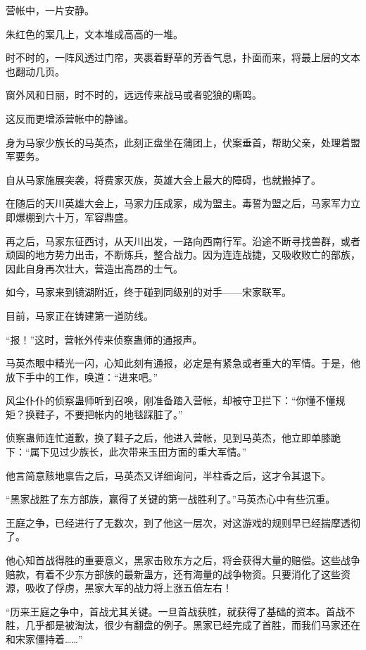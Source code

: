 
\begin{this_body}



营帐中，一片安静。

朱红色的案几上，文本堆成高高的一堆。

时不时的，一阵风透过门帘，夹裹着野草的芳香气息，扑面而来，将最上层的文本也翻动几页。

窗外风和日丽，时不时的，远远传来战马或者驼狼的嘶鸣。

这反而更增添营帐中的静谧。

身为马家少族长的马英杰，此刻正盘坐在蒲团上，伏案垂首，帮助父亲，处理着盟军要务。

自从马家施展突袭，将费家灭族，英雄大会上最大的障碍，也就搬掉了。

在随后的天川英雄大会上，马家力压成家，成为盟主。毒誓为盟之后，马家军力立即爆棚到六十万，军容鼎盛。

再之后，马家东征西讨，从天川出发，一路向西南行军。沿途不断寻找兽群，或者顽固的地方势力出击，不断炼兵，整合战力。因为连连战捷，又吸收败亡的部族，因此自身再次壮大，营造出高昂的士气。

如今，马家来到镜湖附近，终于碰到同级别的对手——宋家联军。

目前，马家正在铸建第一道防线。

“报！”这时，营帐外传来侦察蛊师的通报声。

马英杰眼中精光一闪，心知此刻有通报，必定是有紧急或者重大的军情。于是，他放下手中的工作，唤道：“进来吧。”

风尘仆仆的侦察蛊师听到召唤，刚准备踏入营帐，却被守卫拦下：“你懂不懂规矩？换鞋子，不要把帐内的地毯踩脏了。”

侦察蛊师连忙道歉，换了鞋子之后，他进入营帐，见到马英杰，他立即单膝跪下：“属下见过少族长，此次带来玉田方面的重大军情。”

他言简意赅地禀告之后，马英杰又详细询问，半柱香之后，这才令其退下。

“黑家战胜了东方部族，赢得了关键的第一战胜利了。”马英杰心中有些沉重。

王庭之争，已经进行了无数次，到了他这一层次，对这游戏的规则早已经揣摩透彻了。

他心知首战得胜的重要意义，黑家击败东方之后，将会获得大量的赔偿。这些战争赔款，有着不少东方部族的最新蛊方，还有海量的战争物资。只要消化了这些资源，吸收了俘虏，黑家大军的战力将上涨五倍左右！

“历来王庭之争中，首战尤其关键。一旦首战获胜，就获得了基础的资本。首战不胜，几乎都是被淘汰，很少有翻盘的例子。黑家已经完成了首胜，而我们马家还在和宋家僵持着……”


\end{this_body}
